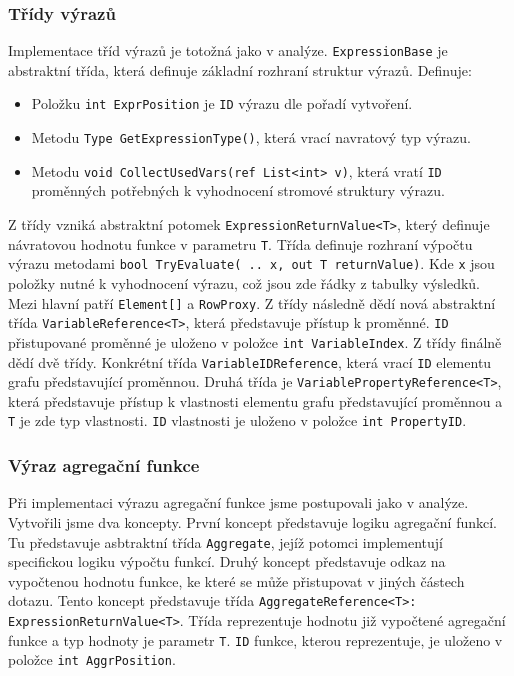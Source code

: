 \subsubsection{Třídy výrazů}

Implementace tříd výrazů je totožná jako v analýze.
\texttt{ExpressionBase} je abstraktní třída, která definuje základní rozhraní struktur výrazů.
Definuje:
\begin{itemize}
\item Položku \texttt{int ExprPosition} je \texttt{ID} výrazu dle pořadí vytvoření.
\item Metodu \texttt{Type GetExpressionType()}, která vrací navratový typ výrazu.
\item Metodu \texttt{void CollectUsedVars(ref List<int> v)}, která vratí \texttt{ID} proměnných potřebných k vyhodnocení stromové struktury výrazu.
\end{itemize}
Z třídy vzniká abstraktní potomek \texttt{ExpressionReturnValue<T>}, který definuje návratovou hodnotu funkce v parametru \texttt{T}.
Třída definuje rozhraní výpočtu výrazu metodami \texttt{bool TryEvaluate( .. x, out T returnValue)}.
Kde \texttt{x} jsou položky nutné k vyhodnocení výrazu, což jsou zde řádky z tabulky výsledků.
Mezi hlavní patří \texttt{Element[]} a \texttt{RowProxy}.
Z třídy následně dědí nová abstraktní třída \texttt{VariableReference<T>}, která představuje přístup k proměnné.
\texttt{ID} přistupované proměnné je uloženo v položce \texttt{int VariableIndex}.
Z třídy finálně dědí dvě třídy.
Konkrétní třída \texttt{VariableIDReference}, která vrací \texttt{ID} elementu grafu představující proměnnou.
Druhá třída je \texttt{VariablePropertyReference<T>}, která představuje přístup k vlastnosti elementu grafu představující proměnnou a \texttt{T} je zde typ vlastnosti.
\texttt{ID} vlastnosti je uloženo v položce \texttt{int PropertyID}. 

\subsubsection{Výraz agregační funkce}

Při implementaci výrazu agregační funkce jsme postupovali jako v analýze.
Vytvořili jsme dva koncepty.
První koncept představuje logiku agregační funkcí.
Tu představuje asbtraktní třída \texttt{Aggregate}, jejíž potomci implementují specifickou logiku výpočtu funkcí. 
Druhý koncept představuje odkaz na vypočtenou hodnotu funkce, ke které se může přistupovat v jiných částech dotazu.
Tento koncept představuje třída \texttt{AggregateReference<T>: ExpressionReturnValue<T>}.
Třída reprezentuje hodnotu již vypočtené agregační funkce a typ hodnoty je parametr \texttt{T}.
\texttt{ID} funkce, kterou reprezentuje, je uloženo v položce \texttt{int AggrPosition}.

